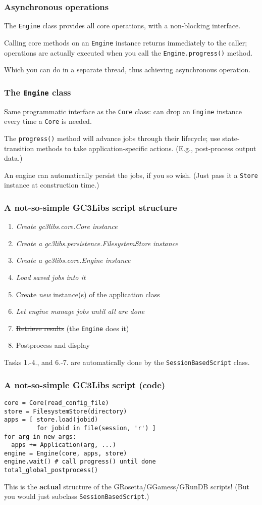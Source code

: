 \documentclass[presentation]{beamer}
\begin{document}
\begin{frame}
\frametitle{Asynchronous operations}
\label{sec-17}

  The \texttt{Engine} class provides all core operations, 
  with a non-blocking interface.

  Calling core methods on an \texttt{Engine} instance returns immediately to
  the caller; operations are actually executed when you call the
  \texttt{Engine.progress()} method.

  Which you can do in a separate thread, thus achieving
  asynchronous operation.
\end{frame}
\begin{frame}
\frametitle{The \texttt{Engine} class}
\label{sec-18}

  Same programmatic interface as the \texttt{Core} class:
  can drop an \texttt{Engine} instance every time a \texttt{Core} is needed.

  The \texttt{progress()} method will advance jobs through their lifecycle; 
  use state-transition methods to take application-specific actions.
  (E.g., post-process output data.)
  
  An engine can automatically persist the jobs, if you so wish.
  (Just pass it a \texttt{Store} instance at construction time.)
\end{frame}
\begin{frame}
\frametitle{A not-so-simple GC3Libs script structure}
\label{sec-19}

\begin{enumerate}
\item \emph{Create gc3libs.core.Core instance}
\item \emph{Create a gc3libs.persistence.FilesystemStore instance}
\item \emph{Create a gc3libs.core.Engine instance}
\item \emph{Load saved jobs into it}
\item Create \emph{new} instance(s) of the application class
\item \emph{Let engine manage jobs until all are done}
\item \st{Retrieve results} (the \texttt{Engine} does it)
\item Postprocess and display
\end{enumerate}

  Tasks 1.-4., and 6.-7. are automatically done by the
  \texttt{SessionBasedScript} class.
\end{frame}
\begin{frame}[fragile]
\frametitle{A not-so-simple GC3Libs script (code)}
\label{sec-20}

\begin{verbatim}
core = Core(read_config_file)
store = FilesystemStore(directory)
apps = [ store.load(jobid) 
         for jobid in file(session, 'r') ]
for arg in new_args:
  apps += Application(arg, ...)
engine = Engine(core, apps, store)
engine.wait() # call progress() until done
total_global_postprocess()
\end{verbatim}

  This is the \textbf{actual} structure of the GRosetta/GGamess/GRunDB
  scripts!   (But you would just subclass \texttt{SessionBasedScript}.)
\end{frame}
\end{document}
